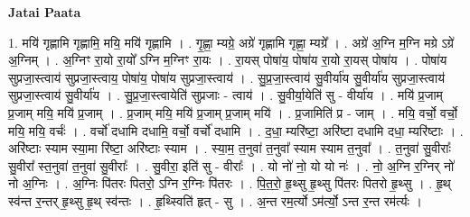 \documentclass[17pt]{extarticle}
\begin{document}
\textbf{Jatai Paata} \newline

1. मयि॑ गृह्णामि गृह्णामि॒ मयि॒ मयि॑ गृह्णामि । . गृ॒ह्णा॒ म्यग्रे॒ अग्रे॑ गृह्णामि गृह्णा॒ म्यग्रे᳚ । . अग्रे॑ अ॒ग्नि म॒ग्नि मग्रे ऽग्रे॑ अ॒ग्निम् । . अ॒ग्निꣳ रा॒यो रा॒यो᳚ ऽग्नि म॒ग्निꣳ रा॒यः । . रा॒यस् पोषा॑य॒ पोषा॑य रा॒यो रा॒यस् पोषा॑य । . पोषा॑य सुप्रजा॒स्त्वाय॑ सुप्रजा॒स्त्वाय॒ पोषा॑य॒ पोषा॑य सुप्रजा॒स्त्वाय॑ । . सु॒प्र॒जा॒स्त्वाय॑ सु॒वीर्या॑य सु॒वीर्या॑य सुप्रजा॒स्त्वाय॑ सुप्रजा॒स्त्वाय॑ सु॒वीर्या॑य । . सु॒प्र॒जा॒स्त्वायेति॑ सुप्रजाः - त्वाय॑ । . सु॒वीर्या॒येति॑ सु - वीर्या॑य । . मयि॑ प्र॒जाम् प्र॒जाम् मयि॒ मयि॑ प्र॒जाम् । . प्र॒जाम् मयि॒ मयि॑ प्र॒जाम् प्र॒जाम् मयि॑ । . प्र॒जामिति॑ प्र - जाम् । . मयि॒ वर्चो॒ वर्चो॒ मयि॒ मयि॒ वर्चः॑ । . वर्चो॑ दधामि दधामि॒ वर्चो॒ वर्चो॑ दधामि । . द॒धा॒ म्यरि॑ष्टा॒ अरि॑ष्टा दधामि दधा॒ म्यरि॑ष्टाः । . अरि॑ष्टाः स्याम स्या॒मा रि॑ष्टा॒ अरि॑ष्टाः स्याम । . स्या॒म॒ त॒नुवा॑ त॒नुवा᳚ स्याम स्याम त॒नुवा᳚ । . त॒नुवा॑ सु॒वीराः᳚ सु॒वीरा᳚ स्त॒नुवा॑ त॒नुवा॑ सु॒वीराः᳚ । . सु॒वीरा॒ इति॑ सु - वीराः᳚ । . यो नो॑ नो॒ यो यो नः॑ । . नो॒ अ॒ग्नि र॒ग्निर् नो॑ नो अ॒ग्निः । . अ॒ग्निः पि॑तरः पितरो॒ ऽग्नि र॒ग्निः पि॑तरः । . पि॒त॒रो॒ हृ॒थ्सु हृ॒थ्सु पि॑तरः पितरो हृ॒थ्सु । . हृ॒थ् स्व॑न्त र॒न्तर् हृ॒थ्सु हृ॒थ् स्व॑न्तः । . हृ॒थ्स्विति॑ हृत् - सु । . अ॒न्त रम॒र्त्यो ऽम॑र्त्यो॒ ऽन्त र॒न्त रम॑र्त्यः । \newline
\end{document}
